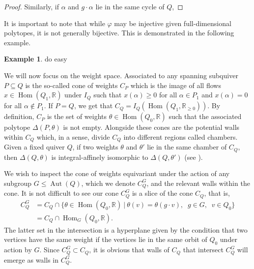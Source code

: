 \documentclass[11pt]{amsart}
\theoremstyle{plain}
\theoremstyle{definition}
\newtheorem{example}[theorem]{Example}
\newcommand{\R}{\mathbb{R}}
\DeclareMathOperator{\aut}{Aut}
\DeclareMathOperator{\Hom}{Hom}
\renewcommand{\hom}{\Hom}
\begin{document}
\begin{proof}
    \color{red}{the idea here (need to check) is that if $g$ sends an edge to another edge in the same cycle then 1 of 2 things can happen. 1) if they are oriented in a way that agrees with the cycle basis then something something prove that this means more edges must be sent, hopefully one that does cross between cycles, i.e. reduce to case 1 from first paragraph. 2) cycle basis dies, i.e. any flow vector that relied on this cycle basis vector now cannot exist -- > thus dimension reduced, contradiction.}\color{black}

    Similarly, if $\alpha$ and $g \cdot \alpha$ lie in the same cycle of $Q$, 

\end{proof}

It is important to note that while $\varphi$ may be injective given full-dimensional polytopes, it is not generally bijective. This is demonstrated in the following example.

\begin{example}
    do easy
\end{example}

We will now focus on the weight space. Associated to any spanning subquiver $P \subseteq Q$ is the so-called cone of weights $C_P$ which is the image of all flows $x \in \hom(Q_1, \R)$ under $I_Q$ such that $x(\alpha) \geq 0$ for all $\alpha \in P_1$ and $x(\alpha) = 0$ for all $\alpha \not\in P_1$. If $P = Q$, we get that $C_Q = I_Q(\hom(Q_1, \R_{\geq0}))$. By definition, $C_P$ is the set of weights $\theta \in \Hom(Q_0, \R)$ such that the associated polytope $\Delta(P, \theta)$ is not empty. Alongside these cones are the potential walls within $C_Q$ which, in a sense, divide $C_Q$ into different regions called chambers. Given a fixed quiver $Q$, if two weights $\theta$ and $\theta'$ lie in the same chamber of $C_Q$, then $\Delta(Q, \theta)$ is integral-affinely isomorphic to $\Delta(Q, \theta')$ (see \cite{hille2003quivers}).
 
We wish to inspect the cone of weights equivariant under the action of any subgroup $G \leq \aut(Q)$, which we denote $C_Q^G$, and the relevant walls within the cone. It is not difficult to see our cone $C_Q^G$ is a slice of the cone $C_Q$, that is, 
\begin{align*}
C_Q^G &= C_Q \cap \{\theta \in \hom(Q_0, \R) \:|\: \theta(v) = \theta(g \cdot v), \;\;g \in G, \;\;v \in Q_0\} \\
&= C_Q \cap \hom_G(Q_0, \R).
\end{align*}
The latter set in the intersection is a hyperplane given by the condition that two vertices have the same weight if the vertices lie in the same orbit of $Q_0$ under action by $G$. Since $C_Q^G \subset C_Q$, it is obvious that walls of $C_Q$ that intersect $C_Q^G$ will emerge as walls in $C_Q^G$.
\end{document}

